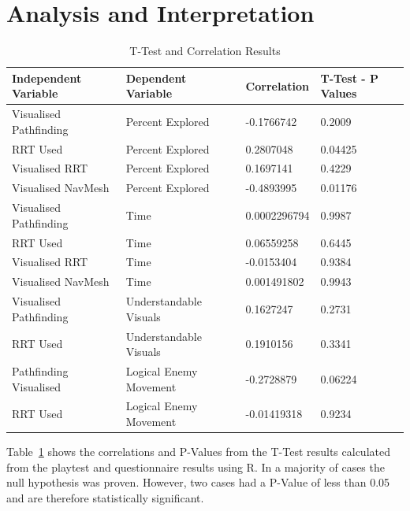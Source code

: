 \documentclass[journal]{IEEEtran}
\begin{document}
	\section{Analysis and Interpretation}
	\begin{table}[]
		\centering
		\caption{T-Test and Correlation Results}
		\label{StatsTable}
		\def\arraystretch{1.5}
		\begin{tabular}{|l|l|l|l|}
			\hline
			\textbf{Independent Variable }    &  \textbf{Dependent Variable } & \textbf{Correlation} & \textbf{T-Test - P Values}                   \\ \hline
			Visualised Pathfinding & Percent Explored       & -0.1766742   & 0.2009            \\ \hline
			RRT Used               & Percent Explored         & 0.2807048    & 0.04425           \\ \hline
			Visualised RRT         & Percent Explored       & 0.1697141    & 0.4229            \\ \hline
			Visualised NavMesh     & Percent Explored       & -0.4893995   & 0.01176           \\ \hline
			Visualised Pathfinding & Time                    & 0.0002296794 & 0.9987            \\ \hline
			RRT Used               & Time                    & 0.06559258   & 0.6445            \\ \hline
			Visualised RRT         & Time                   & -0.0153404   & 0.9384            \\ \hline
			Visualised NavMesh     & Time                   & 0.001491802  & 0.9943            \\ \hline
			Visualised Pathfinding & Understandable Visuals & 0.1627247    & 0.2731            \\ \hline
			RRT Used               & Understandable Visuals & 0.1910156    & 0.3341            \\ \hline
			Pathfinding Visualised & Logical Enemy Movement & -0.2728879   & 0.06224           \\ \hline
			RRT Used               & Logical Enemy Movement & -0.01419318  & 0.9234            \\ \hline
		\end{tabular}
	\end{table}
	
	
	Table~\ref{StatsTable} shows the correlations and P-Values from the T-Test results calculated from the playtest and questionnaire results using R. In a majority of cases the null hypothesis was proven. However, two cases had a P-Value of less than 0.05 and are therefore statistically significant. 
	
\end{document}
